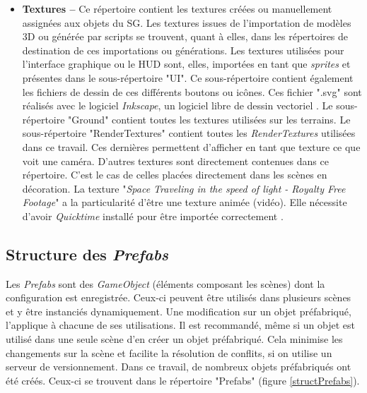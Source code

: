 \begin{itemize}
			\item \textbf{Textures --} Ce répertoire contient les textures créées ou manuellement assignées aux objets du SG. Les textures issues de l'importation de modèles 3D ou générée par scripts se trouvent, quant à elles, dans les répertoires de destination de ces importations ou générations. Les textures utilisées pour l'interface graphique ou le HUD sont, elles, importées en tant que \textit{sprites} et présentes dans le sous-répertoire "UI". Ce sous-répertoire contient également les fichiers de dessin de ces différents boutons ou icônes. Ces fichier ".svg" sont réalisés avec le logiciel \textit{Inkscape}, un logiciel libre de dessin vectoriel \cite{Inkscape_website}. Le sous-répertoire "Ground" contient toutes les textures utilisées sur les terrains. Le sous-répertoire "RenderTextures" contient toutes les \textit{RenderTextures} utilisées dans ce travail. Ces dernières permettent d'afficher en tant que texture ce que voit une caméra. D'autres textures sont directement contenues dans ce répertoire. C'est le cas de celles placées directement dans les scènes en décoration. La texture "\textit{Space Traveling in the speed of light - Royalty Free Footage}" a la particularité d'être une texture animée (vidéo). Elle nécessite d'avoir \textit{Quicktime} \cite{QuickTime_website} installé pour être importée correctement \cite{UnityMovieTexture}.
		\end{itemize}	
		
	\subsection*{Structure des \textit{Prefabs}}
		Les \textit{Prefabs} sont des \textit{GameObject} (éléments composant les scènes) dont la configuration est enregistrée. Ceux-ci peuvent être utilisés dans plusieurs scènes et y être instanciés dynamiquement. Une modification sur un objet préfabriqué, l'applique à chacune de ses utilisations. Il est recommandé, même si un objet est utilisé dans une seule scène \cite{Unity50Tips} d'en créer un objet préfabriqué. Cela minimise les changements sur la scène et facilite la résolution de conflits, si on utilise un serveur de versionnement. Dans ce travail, de nombreux objets préfabriqués ont été créés. Ceux-ci se trouvent dans le répertoire "Prefabs" (figure \ref{structPrefabs}).\medskip
		

